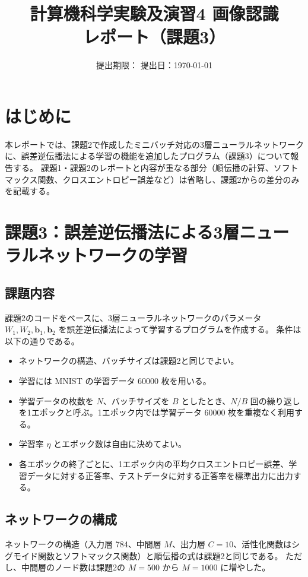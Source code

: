 \documentclass[a4paper,11pt]{ltjsarticle}
\title{計算機科学実験及演習4 画像認識\\レポート（課題3）}
\author{}
\date{提出期限：\todo{提出期限} \quad 提出日：\today}
\begin{document}
\maketitle
\tableofcontents
\newpage

\section{はじめに}
本レポートでは、課題2で作成したミニバッチ対応の3層ニューラルネットワークに、誤差逆伝播法による学習の機能を追加したプログラム（課題3）について報告する。
課題1・課題2のレポートと内容が重なる部分（順伝播の計算、ソフトマックス関数、クロスエントロピー誤差など）は省略し、課題2からの差分のみを記載する。

\section{課題3：誤差逆伝播法による3層ニューラルネットワークの学習}

\subsection{課題内容}
課題2のコードをベースに、3層ニューラルネットワークのパラメータ $W_1, W_2, \bm{b}_1, \bm{b}_2$ を誤差逆伝播法によって学習するプログラムを作成する。
条件は以下の通りである。
\begin{itemize}
  \item ネットワークの構造、バッチサイズは課題2と同じでよい。
  \item 学習には MNIST の学習データ 60000 枚を用いる。
  \item 学習データの枚数を $N$、バッチサイズを $B$ としたとき、$N/B$ 回の繰り返しを1エポックと呼ぶ。1エポック内では学習データ 60000 枚を重複なく利用する。
  \item 学習率 $\eta$ とエポック数は自由に決めてよい。
  \item 各エポックの終了ごとに、1エポック内の平均クロスエントロピー誤差、学習データに対する正答率、テストデータに対する正答率を標準出力に出力する。
\end{itemize}

\subsection{ネットワークの構成}
ネットワークの構造（入力層 784、中間層 $M$、出力層 $C = 10$、活性化関数はシグモイド関数とソフトマックス関数）と順伝播の式は課題2と同じである。
ただし、中間層のノード数は課題2の $M = 500$ から $M = 1000$ に増やした。
\end{document}
